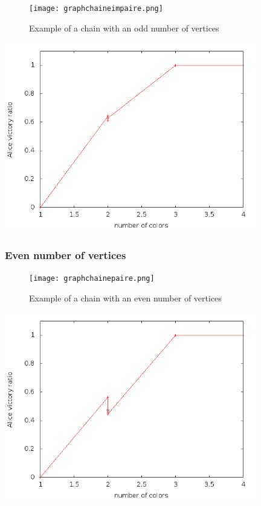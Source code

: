 \begin{figure}[h]
\begin{center}
    \texttt{[image: graphchaineimpaire.png]}
\end{center}
    \caption{Example of a chain with an odd number of vertices}
    \label{chaineimpaire}
\end{figure}

\includegraphics[width=11cm]{resultats/chaineimpaire.png}

\subsubsection{Even number of vertices}

\begin{figure}[h]
\begin{center}  
	\texttt{[image: graphchainepaire.png]}
\end{center}
    \caption{Example of a chain with an even number of vertices}
    \label{chainepaire}
\end{figure}

\includegraphics[width=11cm]{resultats/chainepaire.png}

